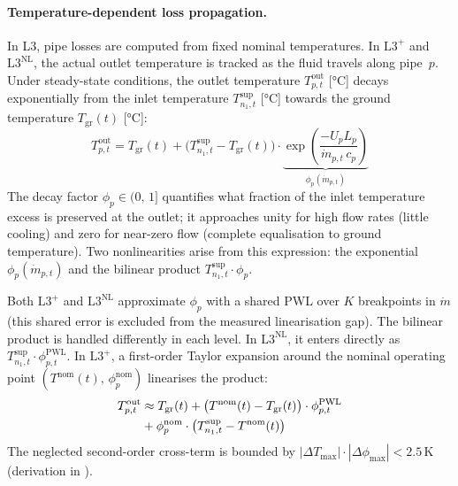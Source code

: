 \documentclass[a4paper,fleqn]{cas-dc}
\newcommand{\Lplus}{\mathrm{L3}^{+}}
\newcommand{\Lnl}{\mathrm{L3}^{\mathrm{NL}}}
\begin{document}
\paragraph{Temperature-dependent loss propagation.}
\label{sec:model_temp_prop}
In L3, pipe losses are computed from fixed nominal temperatures. In
$\Lplus$ and $\Lnl$, the actual outlet temperature is tracked as
the fluid travels along pipe~$p$. Under steady-state conditions,
the outlet temperature $T_{p,t}^{\mathrm{out}}$ [\si{\celsius}]
decays exponentially from the inlet temperature
$T_{n_1,t}^{\mathrm{sup}}$ [\si{\celsius}] towards the ground
temperature $T_{\mathrm{gr}}(t)$ [\si{\celsius}]:
%
\begin{equation}
  T_{p,t}^{\mathrm{out}} = T_{\mathrm{gr}}(t)
    + \bigl(T_{n_1,t}^{\mathrm{sup}} - T_{\mathrm{gr}}(t)\bigr)
    \cdot \underbrace{\exp\!\left(
      \frac{-U_p L_p}{\dot{m}_{p,t}\, c_p}
    \right)}_{\displaystyle\phi_p(\dot{m}_{p,t})}
  \label{eq:temp_prop}
\end{equation}
%
The decay factor $\phi_p \in (0,\,1]$ quantifies what fraction
of the inlet temperature excess is preserved at the outlet; it
approaches unity for high flow rates (little cooling) and zero
for near-zero flow (complete equalisation to ground temperature).
Two nonlinearities arise from this expression: the exponential
$\phi_p(\dot{m}_{p,t})$ and the bilinear product
$T_{n_1,t}^{\mathrm{sup}} \cdot \phi_p$.

Both $\Lplus$ and $\Lnl$ approximate $\phi_p$ with a shared
PWL over $K$ breakpoints in $\dot{m}$ (this shared error is
excluded from the measured linearisation gap). The bilinear
product is handled differently in each level. In $\Lnl$,
it enters directly as $T_{n_1,t}^{\mathrm{sup}} \cdot \phi_{p,t}^{\mathrm{PWL}}$.
In $\Lplus$, a first-order Taylor expansion around the nominal
operating point $(T^{\mathrm{nom}}(t),\, \phi_p^{\mathrm{nom}})$
linearises the product:
%
\begin{align}
  T_{p,t}^{\mathrm{out}} &\approx T_{\mathrm{gr}}(t)
    + \bigl(T^{\mathrm{nom}}(t) - T_{\mathrm{gr}}(t)\bigr)
      \cdot \phi_{p,t}^{\mathrm{PWL}} \notag \\
    &+ \phi_p^{\mathrm{nom}}
      \cdot \bigl(T_{n_1,t}^{\mathrm{sup}} - T^{\mathrm{nom}}(t)\bigr)
  \label{eq:temp_prop_lin}
\end{align}
%
The neglected second-order cross-term is bounded by
$|\Delta T_{\max}| \cdot |\Delta\phi_{\max}| < 2.5\,\text{K}$
(derivation in ).
\end{document}
